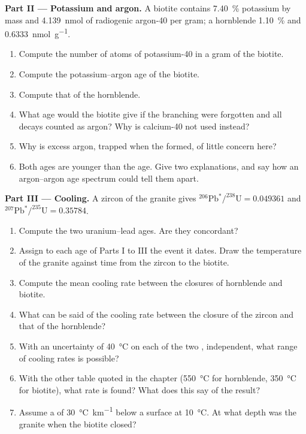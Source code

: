 \begin{problem}
\noindent\textbf{Part II --- Potassium and argon.} A biotite contains
\qty{7.40}{\percent} potassium by mass and \qty{4.139}{nmol} of radiogenic
argon-40 per gram; a hornblende \qty{1.10}{\percent} and \qty{0.6333}{nmol.g^{-1}}.
\begin{enumerate}[resume]
  \item Compute the number of atoms of potassium-40 in a gram of the biotite.
  \item Compute the potassium--argon age of the biotite.
  \item Compute that of the hornblende.
  \item What age would the biotite give if the branching were forgotten and all
        decays counted as argon? Why is calcium-40 not used instead?
  \item Why is excess argon, trapped when the  formed, of little concern
        here?
  \item Both ages are younger than the  age. Give two explanations, and
        say how an argon--argon age spectrum could tell them apart.
\end{enumerate}

\noindent\textbf{Part III --- Cooling.} A zircon of the granite gives
$^{206}\mathrm{Pb}^*/^{238}\mathrm{U} = 0.049361$ and
$^{207}\mathrm{Pb}^*/^{235}\mathrm{U} = 0.35784$.
\begin{enumerate}[resume]
  \item Compute the two uranium--lead ages. Are they concordant?
  \item Assign to each age of Parts I to III the event it dates. Draw the
        temperature of the granite against time from the zircon to the biotite.
  \item Compute the mean cooling rate between the closures of hornblende and
        biotite.
  \item What can be said of the cooling rate between the closure of the zircon
        and that of the hornblende?
  \item With an uncertainty of \qty{40}{\celsius} on each of the two , independent, what range of cooling rates is possible?
  \item With the other table quoted in the chapter (\qty{550}{\celsius} for
        hornblende, \qty{350}{\celsius} for biotite), what rate is found? What
        does this say of the result?
  \item Assume a  of \qty{30}{\celsius.km^{-1}} below a surface at
        \qty{10}{\celsius}. At what depth was the granite when the biotite
        closed?
\end{enumerate}


\end{problem}
